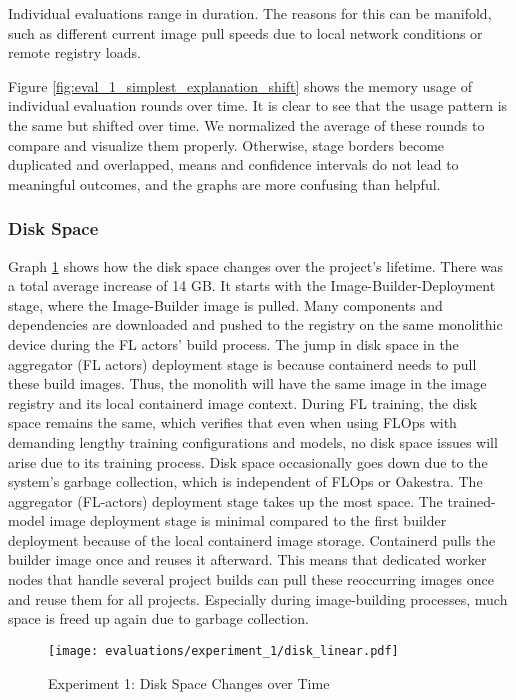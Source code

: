 Individual evaluations range in duration.
The reasons for this can be manifold, such as different current image pull speeds due to local network conditions or remote registry loads.

Figure \ref{fig:eval_1_simplest_explanation_shift} shows the memory usage of individual evaluation rounds over time.
It is clear to see that the usage pattern is the same but shifted over time.
We normalized the average of these rounds to compare and visualize them properly.
Otherwise, stage borders become duplicated and overlapped, means and confidence intervals do not lead to meaningful outcomes, and the graphs are more confusing than helpful.

\subsubsection{Disk Space} \label{subsection:disc_space}

Graph \ref{fig:eval_1_simplest_disk_space} shows how the disk space changes over the project's lifetime.
There was a total average increase of 14 GB.
It starts with the Image-Builder-Deployment stage, where the Image-Builder image is pulled.
Many components and dependencies are downloaded and pushed to the registry on the same monolithic device during the FL actors' build process.
The jump in disk space in the aggregator (FL actors) deployment stage is because containerd needs to pull these build images.
Thus, the monolith will have the same image in the image registry and its local containerd image context.
During FL training, the disk space remains the same, which verifies that even when using FLOps with demanding lengthy training configurations and models, no disk space issues will arise due to its training process.
Disk space occasionally goes down due to the system's garbage collection, which is independent of FLOps or Oakestra.
The aggregator (FL-actors) deployment stage takes up the most space.
The trained-model image deployment stage is minimal compared to the first builder deployment because of the local containerd image storage.
Containerd pulls the builder image once and reuses it afterward.
This means that dedicated worker nodes that handle several project builds can pull these reoccurring images once and reuse them for all projects.
Especially during image-building processes, much space is freed up again due to garbage collection.

\begin{figure}[t]
    \begin{adjustwidth}{-0.2\paperwidth}{-0.2\paperwidth}
        \centering
        \texttt{[image: evaluations/experiment\_1/disk\_linear.pdf]}
        \caption{Experiment 1: Disk Space Changes over Time}
        \label{fig:eval_1_simplest_disk_space}
    \end{adjustwidth}
\end{figure}

